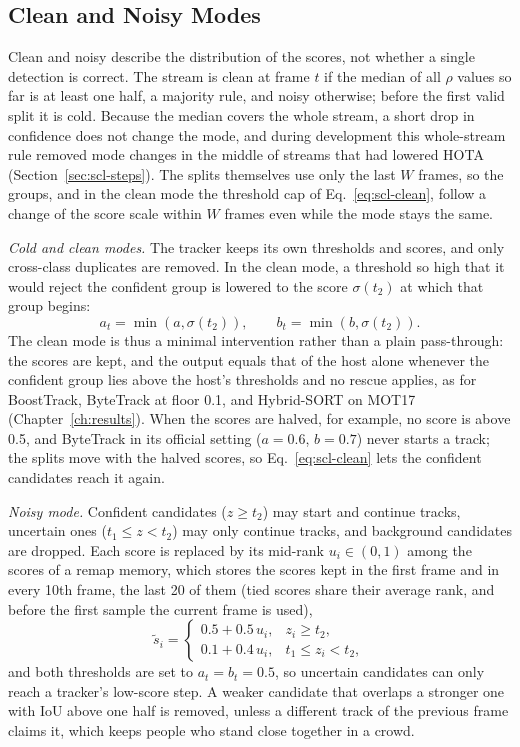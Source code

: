 \subsection{Clean and Noisy Modes}\label{sec:scl-modes}
Clean and noisy describe the distribution of the scores, not whether a single detection is correct. The stream is clean at frame $t$ if the median of all $\rho$ values so far is at least one half, a majority rule, and noisy otherwise; before the first valid split it is cold. Because the median covers the whole stream, a short drop in confidence does not change the mode, and during development this whole-stream rule removed mode changes in the middle of streams that had lowered HOTA (Section~\ref{sec:scl-steps}). The splits themselves use only the last $W$ frames, so the groups, and in the clean mode the threshold cap of Eq.~\eqref{eq:scl-clean}, follow a change of the score scale within $W$ frames even while the mode stays the same.

\emph{Cold and clean modes.} The tracker keeps its own thresholds and scores, and only cross-class duplicates are removed. In the clean mode, a threshold so high that it would reject the confident group is lowered to the score $\sigma(t_2)$ at which that group begins:
\begin{equation}
a_t=\min\!\left(a,\sigma(t_2)\right),\qquad b_t=\min\!\left(b,\sigma(t_2)\right).
\label{eq:scl-clean}
\end{equation}
The clean mode is thus a minimal intervention rather than a plain pass-through: the scores are kept, and the output equals that of the host alone whenever the confident group lies above the host's thresholds and no rescue applies, as for BoostTrack, ByteTrack at floor 0.1, and Hybrid-SORT on MOT17 (Chapter~\ref{ch:results}). When the scores are halved, for example, no score is above 0.5, and ByteTrack in its official setting ($a=0.6$, $b=0.7$) never starts a track; the splits move with the halved scores, so Eq.~\eqref{eq:scl-clean} lets the confident candidates reach it again.

\emph{Noisy mode.} Confident candidates ($z\ge t_2$) may start and continue tracks, uncertain ones ($t_1\le z<t_2$) may only continue tracks, and background candidates are dropped. Each score is replaced by its mid-rank $u_i\in(0,1)$ among the scores of a remap memory, which stores the scores kept in the first frame and in every 10th frame, the last 20 of them (tied scores share their average rank, and before the first sample the current frame is used),
\begin{equation}
\tilde{s}_i=
\begin{cases}
0.5+0.5\,u_i, & z_i\ge t_2,\\
0.1+0.4\,u_i, & t_1\le z_i<t_2,
\end{cases}
\label{eq:scl-remap}
\end{equation}
and both thresholds are set to $a_t=b_t=0.5$, so uncertain candidates can only reach a tracker's low-score step. A weaker candidate that overlaps a stronger one with IoU above one half is removed, unless a different track of the previous frame claims it, which keeps people who stand close together in a crowd.

